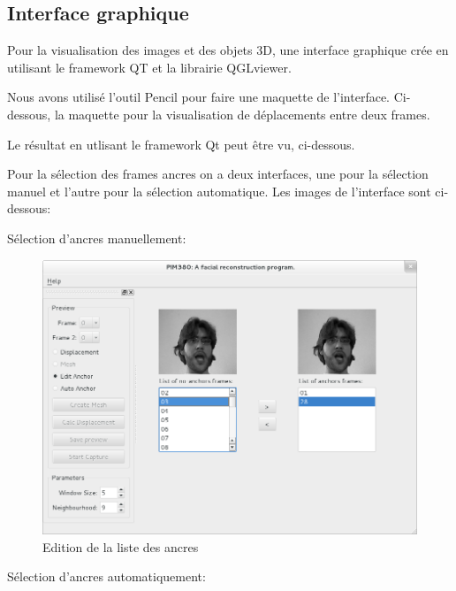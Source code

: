 \documentclass[a4paper,11pt]{article}
\begin{document}
\subsection*{Interface graphique}

Pour la visualisation des images et des objets 3D, une interface graphique crée en utilisant le framework QT et la librairie QGLviewer. 

Nous avons utilisé l’outil Pencil pour faire une maquette de l’interface. Ci-dessous, la maquette pour la visualisation de déplacements entre deux frames.

Le résultat en utlisant le framework Qt peut être vu, ci-dessous.

Pour la sélection des  frames ancres on a deux interfaces, une pour la sélection manuel et l’autre pour la sélection automatique. Les images de l’interface sont ci-dessous:

Sélection d'ancres manuellement: 

\begin{figure}[h!]
  \begin{center}
    \includegraphics[scale=0.4]{img/editAnchorList.png}
    \caption{Edition de la liste des ancres}
  \end{center}
\end{figure}

Sélection d'ancres automatiquement:
\end{document}
